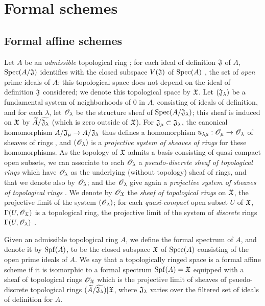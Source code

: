 \section{Formal schemes}
\label{section-formal-schemes}

\subsection{Formal affine schemes}
\label{subsection-formal-affine-schemes}

\begin{env}[10.1.1]
\label{1.10.1.1}
Let $A$ be an \emph{admissible} topological ring ; for each ideal of definition $\mathfrak{J}$ of $A$, ${\mathop{\mathrm{Spec}}\nolimits}(A/\mathfrak{J})$ identifies with the closed subspace $V(\mathfrak{J})$ of ${\mathop{\mathrm{Spec}}\nolimits}(A)$ , the set of \emph{open} prime ideals of $A$; this topological space does not depend
on the ideal of definition $\mathfrak{J}$ considered; we denote this topological space by $\mathfrak{X}$. Let $(\mathfrak{J}_\lambda)$ be a fundamental system of neighborhoods of $0$ in $A$, consisting of ideals of definition, and for each $\lambda$, let $\mathscr{O}_\lambda$ be the structure sheaf of ${\mathop{\mathrm{Spec}}\nolimits}(A/\mathfrak{J}_\lambda)$; this sheaf is induced on $\mathfrak{X}$ by $\widetilde{A}/\widetilde{\mathfrak{J}_\lambda}$ (which is zero outside of $\mathfrak{X}$).
For $\mathfrak{J}_\mu\subset\mathfrak{J}_\lambda$, the canonical homomorphism $A/\fk{J}_\mu\to A/\fk{J}_\lambda$ thus defines a homomorphism $u_{\lambda\mu}:\OO_\mu\to\OO_\lambda$ of sheaves of rings , and $(\mathscr{O}_\lambda)$ is a \emph{projective system of sheaves of rings} for these homomorphisms.
As the topology of $\mathfrak{X}$ admits a basis consisting of quasi-compact open subsets, we can associate to each $\mathscr{O}_\lambda$ a \emph{pseudo-discrete sheaf of topological rings}  which have $\mathscr{O}_\lambda$ as the underlying (without topology) sheaf of rings, and that we denote also by $\mathscr{O}_\lambda$; and the $\mathscr{O}_\lambda$ give again a \emph{projective system of sheaves of topological rings} .
We denote by $\mathscr{O}_\mathfrak{X}$ the \emph{sheaf of topological rings} on $\mathfrak{X}$, the projective limit of the system $(\mathscr{O}_\lambda)$; for each \emph{quasi-compact} open subset $U$ of $\mathfrak{X}$, $\Gamma(U,\mathscr{O}_\mathfrak{X})$ is a topological ring, the projective limit of the system of \emph{discrete} rings $\Gamma(U,\mathscr{O}_\lambda)$ .
\end{env}

\begin{defn}[10.1.2]
\label{1.10.1.2}
Given an admissible topological ring $A$, we define the formal spectrum of $A$, and denote it by ${\mathop{\mathrm{Spf}}\nolimits}(A)$, to be the closed subspace $\mathfrak{X}$ of ${\mathop{\mathrm{Spec}}\nolimits}(A)$ consisting of the open prime ideals of $A$.
We say that a topologically ringed space is a formal affine scheme if it is isomorphic to a formal spectrum ${\mathop{\mathrm{Spf}}\nolimits}(A)=\mathfrak{X}$ equipped with a sheaf of topological rings $\mathscr{O}_\mathfrak{X}$ which is the projective limit of sheaves of psuedo-discrete topological rings $(\widetilde{A}/\widetilde{\mathfrak{J}_\lambda})|\mathfrak{X}$, where $\mathfrak{J}_\lambda$ varies over the filtered set of ideals of definition for $A$.
\end{defn}

